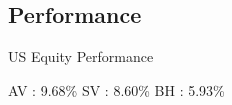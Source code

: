 \documentclass[handout]{beamer}
\begin{document}
\subsection{Performance}
%
\begin{frame}{US Equity Performance}
	\begin{figure}
		\resizebox{11cm}{6.5cm}{}
	\end{figure}
	\centering
	AV : 9.68\%  SV : 8.60\%  BH : 5.93\%
\end{frame}
\end{document}
